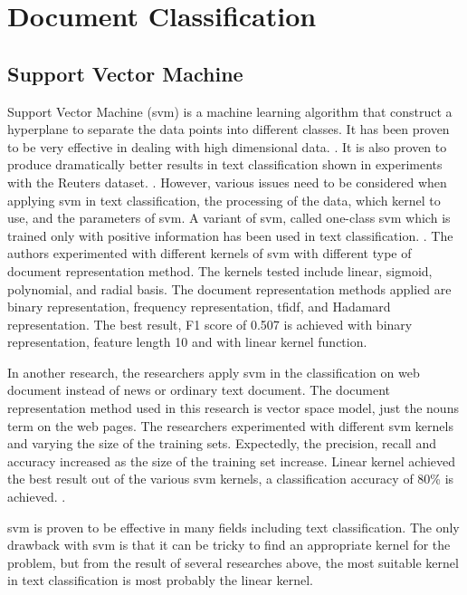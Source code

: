 \section{Document Classification}
\subsection{Support Vector Machine}
Support Vector Machine (\ac{svm}) is a machine learning algorithm that construct a hyperplane to separate the data points into different classes. It has been proven to be very effective in dealing with high dimensional data. \cite{webSvm}. It is also proven to produce dramatically better results in text classification shown in experiments with the Reuters dataset. \cite{inductiveText}. However, various issues need to be considered when applying \ac{svm} in text classification, the processing of the data, which kernel to use, and the parameters of \ac{svm}. A variant of \ac{svm}, called one-class \ac{svm} which is trained only with positive information has been used in text classification. \cite{oneSvm}.  The authors experimented with different kernels of \ac{svm} with different type of document representation method. The kernels tested include linear, sigmoid, polynomial, and radial basis. The document representation methods applied are binary representation, frequency representation, \ac{tfidf}, and Hadamard representation. The best result, F1 score of 0.507 is achieved with binary representation, feature length 10 and with linear kernel function.  

In another research, the researchers apply \ac{svm} in the classification on web document instead of news or ordinary text document. The document representation method used in this research is vector space model, just the nouns term on the web pages. The researchers experimented with different \ac{svm} kernels and varying the size of the training sets. Expectedly, the precision, recall and accuracy increased as the size of the training set increase. Linear kernel achieved the best result out of the various \ac{svm} kernels, a classification accuracy of 80\% is achieved. \cite{webSvm}.
	
\Ac{svm} is proven to be effective in many fields including text classification. The only drawback with \ac{svm} is that it can be tricky to find an appropriate kernel for the problem, but from the result of several researches above, the most suitable kernel in text classification is most probably the linear kernel.\\


